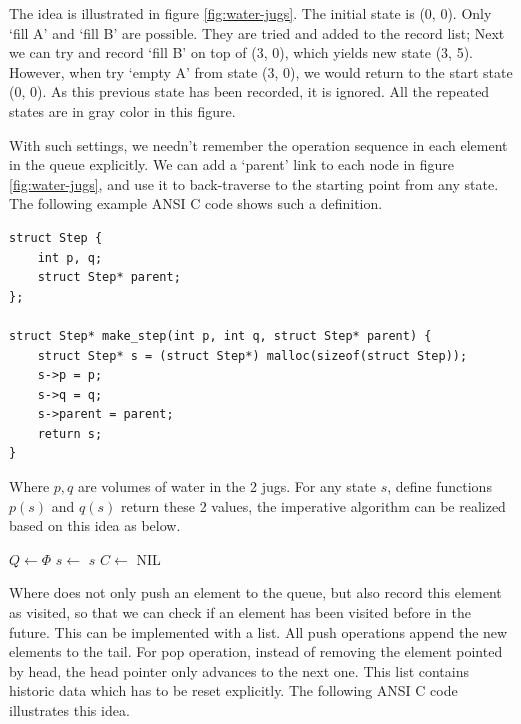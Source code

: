 \documentclass[UTF8]{article}
\begin{document}
The idea is illustrated in figure \ref{fig:water-jugs}. The initial state
is (0, 0). Only `fill A' and `fill B' are possible. They are tried and
added to the record list; Next we can try and record `fill B' on top of (3, 0),
which yields new state (3, 5). However, when try `empty A' from state (3, 0),
we would return to the start state (0, 0). As this previous state has been
recorded, it is ignored. All the repeated states are in gray color in this
figure.

With such settings, we needn't remember the operation sequence in each element
in the queue explicitly. We can add a `parent' link to each node in figure
\ref{fig:water-jugs}, and use it to back-traverse to the starting point from
any state. The following example ANSI C code shows such a definition.

\lstset{language=C}
\begin{lstlisting}
struct Step {
    int p, q;
    struct Step* parent;
};

struct Step* make_step(int p, int q, struct Step* parent) {
    struct Step* s = (struct Step*) malloc(sizeof(struct Step));
    s->p = p;
    s->q = q;
    s->parent = parent;
    return s;
}
\end{lstlisting}

Where $p, q$ are volumes of water in the 2 jugs. For any state $s$,
define functions $p(s)$ and $q(s)$ return these 2 values, the imperative algorithm
can be realized based on this idea as below.

\begin{algorithmic}[1]
  \State $Q \gets \Phi$
  \State {}
    \State $s \gets$ 
      \State \Return $s$
    \Else
      \State $C \gets$ 
          \State {}
        \EndIf
      \EndFor
    \EndIf
  \EndWhile
  \State \Return NIL
\EndFunction
\end{algorithmic}

Where  does not only push an element to the queue, but also
record this element as visited, so that we can check if an element has been visited
before in the future. This can be implemented with a list. All push operations
append the new elements to the tail. For pop operation, instead of removing the element
pointed by head, the head pointer only advances to the next one. This list contains
historic data which has to be reset explicitly. The following ANSI C
code illustrates this idea.
\end{document}
